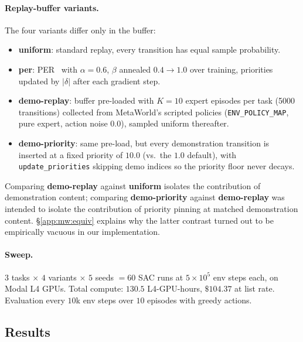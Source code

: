 \paragraph{Replay-buffer variants.}
The four variants differ only in the buffer:
\begin{itemize}\itemsep0pt
  \item \textbf{uniform}: standard replay, every transition has
        equal sample probability.
  \item \textbf{per}: PER~\citep{schaul2016per} with $\alpha=0.6$,
        $\beta$ annealed $0.4\!\to\!1.0$ over training, priorities
        updated by $|\delta|$ after each gradient step.
  \item \textbf{demo-replay}: buffer pre-loaded with $K\!=\!10$
        expert episodes per task (5000 transitions) collected from
        MetaWorld's scripted policies (\texttt{ENV\_POLICY\_MAP}, pure
        expert, action noise $0.0$), sampled uniform thereafter.
  \item \textbf{demo-priority}: same pre-load, but every
        demonstration transition is inserted at a fixed priority of
        $10.0$ (vs.\ the $1.0$ default), with
        \texttt{update\_priorities} skipping demo indices so the
        priority floor never decays.
\end{itemize}
Comparing \textbf{demo-replay} against \textbf{uniform} isolates the
contribution of demonstration content; comparing
\textbf{demo-priority} against \textbf{demo-replay} was intended to
isolate the contribution of priority pinning at matched demonstration
content. \S\ref{app:mw:equiv} explains why the latter contrast turned
out to be empirically vacuous in our implementation.

\paragraph{Sweep.}
$3$ tasks $\times$ $4$ variants $\times$ $5$ seeds $= 60$ SAC runs at
$5{\times}10^5$ env steps each, on Modal L4 GPUs. Total compute:
$130.5$ L4-GPU-hours, $\$104.37$ at list rate. Evaluation every $10$k
env steps over $10$ episodes with greedy actions.

\subsection{Results}
\label{app:mw:results}

